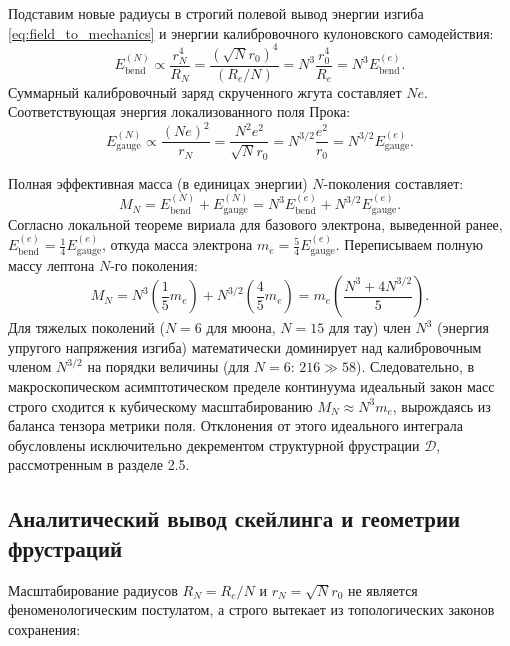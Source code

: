 \documentclass[11pt,a4paper]{article}
\begin{document}
Подставим новые радиусы в строгий полевой вывод энергии изгиба \eqref{eq:field_to_mechanics} и энергии калибровочного кулоновского самодействия:
\begin{equation}
E_{\text{bend}}^{(N)} \propto \frac{r_N^4}{R_N} = \frac{(\sqrt{N} r_0)^4}{(R_e / N)} = N^3 \frac{r_0^4}{R_e} = N^3 E_{\text{bend}}^{(e)}.
\end{equation}
Суммарный калибровочный заряд скрученного жгута составляет $N e$. Соответствующая энергия локализованного поля Прока:
\begin{equation}
E_{\text{gauge}}^{(N)} \propto \frac{(Ne)^2}{r_N} = \frac{N^2 e^2}{\sqrt{N} r_0} = N^{3/2} \frac{e^2}{r_0} = N^{3/2} E_{\text{gauge}}^{(e)}.
\end{equation}

Полная эффективная масса (в единицах энергии) $N$-поколения составляет:
\begin{equation}
M_N = E_{\text{bend}}^{(N)} + E_{\text{gauge}}^{(N)} = N^3 E_{\text{bend}}^{(e)} + N^{3/2} E_{\text{gauge}}^{(e)}.
\end{equation}
Согласно локальной теореме вириала для базового электрона, выведенной ранее, $E_{\text{bend}}^{(e)} = \frac{1}{4} E_{\text{gauge}}^{(e)}$, откуда масса электрона $m_e = \frac{5}{4} E_{\text{gauge}}^{(e)}$. 
Переписываем полную массу лептона $N$-го поколения:
\begin{equation}
M_N = N^3 \left( \frac{1}{5} m_e \right) + N^{3/2} \left( \frac{4}{5} m_e \right) = m_e \left( \frac{N^3 + 4 N^{3/2}}{5} \right).
\end{equation}
Для тяжелых поколений ($N=6$ для мюона, $N=15$ для тау) член $N^3$ (энергия упругого напряжения изгиба) математически доминирует над калибровочным членом $N^{3/2}$ на порядки величины (для $N=6$: $216 \gg 58$).
Следовательно, в макроскопическом асимптотическом пределе континуума идеальный закон масс строго сходится к кубическому масштабированию $M_N \approx N^3 m_e$, вырождаясь из баланса тензора метрики поля. Отклонения от этого идеального интеграла обусловлены исключительно декрементом структурной фрустрации $\mathcal{D}$, рассмотренным в разделе 2.5.
	
\subsection{Аналитический вывод скейлинга и геометрии фрустраций}
Масштабирование радиусов $R_N = R_e/N$ и $r_N = \sqrt{N}r_0$ не является феноменологическим постулатом, а строго вытекает из топологических законов сохранения:
\end{document}
